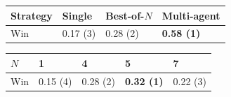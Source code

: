 \documentclass{article}
\begin{document}
\begin{table}[t!]
\vspace{0mm}
\begin{minipage}{0.48\textwidth}
    \centering
    \label{tab:ablation-compute}
    \vspace{-2mm}
    \begin{tabular}{x{45pt}| x{38pt} x{40pt} x{38pt}}\toprule
    Strategy 
    & Single 
    & Best-of-$N$ 
    &  Multi-agent \\\midrule
    Win 
    & 0.17 (3) 
    & 0.28 (2) 
    &  \textbf{0.58 (1)} \\
    \bottomrule
    \end{tabular}
\end{minipage}
\hspace{1.5mm}
\begin{minipage}{0.48\textwidth}
    \centering
    \label{tab:ablation-rounds}
    \vspace{-2mm}
    \begin{tabular}{x{40pt}| x{34pt} x{34pt} x{34pt} x{34pt}}\toprule
    $N$ 
    & 1 
    & 4 
    &  5 
    & 7 \\\midrule
    Win 
    & 0.15 (4) 
    & 0.28 (2) 
    &  \textbf{0.32 (1)} 
    & 0.22 (3) \\
    \bottomrule
    \end{tabular}
\end{minipage}\\


\end{table}
\end{document}
